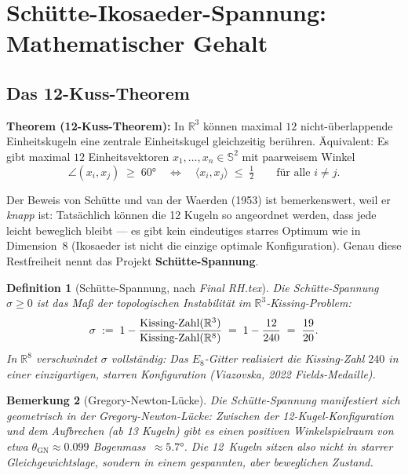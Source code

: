 \documentclass[12pt,a4paper]{article}
\newtheorem{definition}{Definition}[section]
\newtheorem{bemerkung}[definition]{Bemerkung}
\newcommand{\R}{\mathbb{R}}
\newcommand{\Ssph}{\mathbb{S}^2}
\begin{document}
\section{Schütte-Ikosaeder-Spannung: Mathematischer Gehalt}
\label{sec:schuette}

\subsection{Das 12-Kuss-Theorem}

\begin{tcolorbox}[ergebnis, title={Satz von Schütte und van der Waerden (1953) -- bewiesen}]
\textbf{Theorem (12-Kuss-Theorem):}
In $\R^3$ können maximal $12$ nicht-überlappende Einheitskugeln eine
zentrale Einheitskugel gleichzeitig berühren.
Äquivalent: Es gibt maximal $12$ Einheitsvektoren $x_1,\dots,x_n \in \Ssph$
mit paarweisem Winkel
\[
  \angle(x_i, x_j) \;\geq\; 60°
  \quad \Longleftrightarrow \quad
  \langle x_i, x_j \rangle \;\leq\; \tfrac{1}{2}
  \qquad \text{für alle } i \neq j.
\]
\end{tcolorbox}

Der Beweis von Schütte und van der Waerden (1953) ist bemerkenswert, weil
er \emph{knapp} ist: Tatsächlich können die 12 Kugeln so angeordnet werden,
dass jede leicht beweglich bleibt --- es gibt kein eindeutiges starres
Optimum wie in Dimension~8 (Ikosaeder ist nicht die einzige optimale
Konfiguration).
Genau diese Restfreiheit nennt das Projekt \textbf{Schütte-Spannung}.

\begin{definition}[Schütte-Spannung, nach \textit{Final RH.tex}]
\label{def:spannung}
Die \emph{Schütte-Spannung} $\sigma \geq 0$ ist das Maß der
topologischen Instabilität im $\R^3$-Kissing-Problem:
\[
  \sigma \;:=\; 1 - \frac{\text{Kissing-Zahl}(\R^3)}{%
  \text{Kissing-Zahl}(\R^8)} \;=\; 1 - \frac{12}{240} \;=\; \frac{19}{20}.
\]
In $\R^8$ verschwindet $\sigma$ vollständig: Das $E_8$-Gitter realisiert
die Kissing-Zahl $240$ in einer einzigartigen, starren Konfiguration
(Viazovska, 2022 Fields-Medaille).
\end{definition}

\begin{bemerkung}[Gregory-Newton-Lücke]
Die Schütte-Spannung manifestiert sich geometrisch in der
\emph{Gregory-Newton-Lücke}: Zwischen der 12-Kugel-Konfiguration und dem
Aufbrechen (ab 13 Kugeln) gibt es einen positiven Winkelspielraum von
etwa $\theta_\mathrm{GN} \approx 0.099$ Bogenmass~$\approx 5.7°$.
Die 12~Kugeln sitzen also \emph{nicht} in starrer Gleichgewichtslage,
sondern in einem \emph{gespannten}, aber beweglichen Zustand.
\end{bemerkung}
\end{document}
